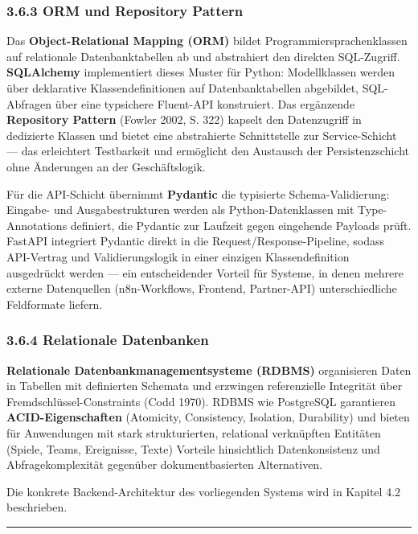 \subsubsection{3.6.3 ORM und Repository
Pattern}\label{orm-und-repository-pattern}

Das \textbf{Object-Relational Mapping (ORM)} bildet
Programmiersprachenklassen auf relationale Datenbanktabellen ab und
abstrahiert den direkten SQL-Zugriff. \textbf{SQLAlchemy} implementiert
dieses Muster für Python: Modellklassen werden über deklarative
Klassendefinitionen auf Datenbanktabellen abgebildet, SQL-Abfragen über
eine typsichere Fluent-API konstruiert. Das ergänzende
\textbf{Repository Pattern} (Fowler 2002, S. 322) kapselt den
Datenzugriff in dedizierte Klassen und bietet eine abstrahierte
Schnittstelle zur Service-Schicht --- das erleichtert Testbarkeit und
ermöglicht den Austausch der Persistenzschicht ohne Änderungen an der
Geschäftslogik.

Für die API-Schicht übernimmt \textbf{Pydantic} die typisierte
Schema-Validierung: Eingabe- und Ausgabestrukturen werden als
Python-Datenklassen mit Type-Annotations definiert, die Pydantic zur
Laufzeit gegen eingehende Payloads prüft. FastAPI integriert Pydantic
direkt in die Request/Response-Pipeline, sodass API-Vertrag und
Validierungslogik in einer einzigen Klassendefinition ausgedrückt werden
--- ein entscheidender Vorteil für Systeme, in denen mehrere externe
Datenquellen (n8n-Workflows, Frontend, Partner-API) unterschiedliche
Feldformate liefern.

\subsubsection{3.6.4 Relationale
Datenbanken}\label{relationale-datenbanken}

\textbf{Relationale Datenbankmanagementsysteme (RDBMS)} organisieren
Daten in Tabellen mit definierten Schemata und erzwingen referenzielle
Integrität über Fremdschlüssel-Constraints (Codd 1970). RDBMS wie
PostgreSQL garantieren \textbf{ACID-Eigenschaften} (Atomicity,
Consistency, Isolation, Durability) und bieten für Anwendungen mit stark
strukturierten, relational verknüpften Entitäten (Spiele, Teams,
Ereignisse, Texte) Vorteile hinsichtlich Datenkonsistenz und
Abfragekomplexität gegenüber dokumentbasierten Alternativen.

Die konkrete Backend-Architektur des vorliegenden Systems wird in
Kapitel 4.2 beschrieben.

\begin{center}\rule{0.5\linewidth}{0.5pt}\end{center}


